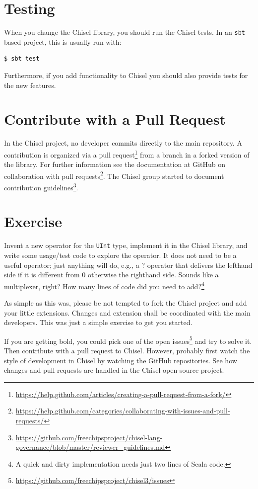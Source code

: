 \documentclass[%
    10pt,
    headinclude, footexclude,
    openright, %
    notitlepage,
    cleardoubleempty,
    headsepline,
    pointlessnumbers,
    bibtotoc, idxtotoc,
    ]{scrbook}
\newcommand{\code}[1]{{\small{\texttt{#1}}}}
\newcommand{\myref}[2]{\href{#1}{#2}}
\renewcommand{\myref}[2]{{#2}{\footnote{\url{#1}}}}
\begin{document}
\section{Testing}

When you change the Chisel library, you should run the Chisel tests.
In an \code{sbt} based project, this is usually run with:

\begin{verbatim}
$ sbt test
\end{verbatim}

Furthermore, if you add functionality to Chisel you should also provide tests for the
new features.

\section{Contribute with a Pull Request}

In the Chisel project, no developer commits directly to the main repository.
A contribution is organized via a
\myref{https://help.github.com/articles/creating-a-pull-request-from-a-fork/}{pull request}
from a branch in a forked version of the library.
For further information see the documentation at GitHub on
\myref{https://help.github.com/categories/collaborating-with-issues-and-pull-requests/}{collaboration with
pull requests}.
The Chisel group started to document
\myref{https://github.com/freechipsproject/chisel-lang-governance/blob/master/reviewer_guidelines.md}{contribution
guidelines}.

\section{Exercise}

Invent a new operator for the \code{UInt} type, implement it in the Chisel library,
and write some usage/test code to explore the operator. It does not need to be
a useful operator; just anything will do, e.g., a ? operator that delivers the lefthand side
if it is different from 0 otherwise the righthand side. Sounds like a multiplexer, right?
How many lines of code did you need to add?\footnote{A quick and dirty implementation
needs just two lines of Scala code.}

As simple as this was, please be not tempted to fork the Chisel project and
add your little extensions. Changes and extension shall be coordinated with the
main developers.
This was just a simple exercise to get you started.

If you are getting bold, you could pick one of the
\myref{https://github.com/freechipsproject/chisel3/issues}{open issues} and try to solve it.
Then contribute with a pull request to Chisel.
However, probably first watch the style of development in Chisel by watching the GitHub
repositories.
See how changes and pull requests are handled in the Chisel open-source project.
\end{document}
